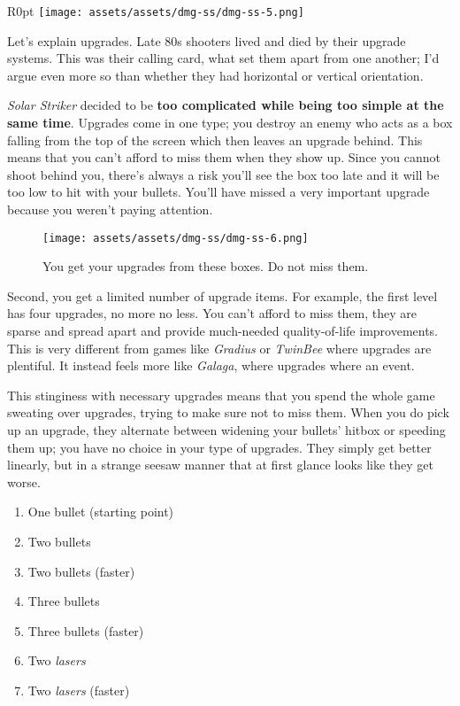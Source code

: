 \documentclass{book}
\begin{document}
\begin{wrapfigure}{R}{0pt} \texttt{[image: assets/assets/dmg-ss/dmg-ss-5.png]}\end{wrapfigure}
Let’s explain upgrades. Late 80s shooters lived and died by their upgrade systems. This was their calling card, what set them apart from one another; I’d argue even more so than whether they had horizontal or vertical orientation.

\emph{Solar Striker} decided to be \textbf{too complicated while being too simple at the same time}. Upgrades come in one type; you destroy an enemy who acts as a box falling from the top of the screen which then leaves an upgrade behind. This means that you can’t afford to miss them when they show up. Since you cannot shoot behind you, there’s always a risk you’ll see the box too late and it will be too low to hit with your bullets. You’ll have missed a very important upgrade because you weren’t paying attention.

\begin{figure}[hbt]
\vskip 10pt
\centering \texttt{[image: assets/assets/dmg-ss/dmg-ss-6.png]}\par\pagetwodescription You get your upgrades from these boxes. Do not miss them.
\vskip 6pt
\end{figure}

Second, you get a limited number of upgrade items. For example, the first level has four upgrades, no more no less. You can’t afford to miss them, they are sparse and spread apart and provide much-needed quality-of-life improvements. This is very different from games like \emph{Gradius} or \emph{TwinBee} where upgrades are plentiful. It instead feels more like \emph{Galaga}, where upgrades where an event.

This stinginess with necessary upgrades means that you spend the whole game sweating over upgrades, trying to make sure not to miss them. When you do pick up an upgrade, they alternate between widening your bullets’ hitbox or speeding them up; you have no choice in your type of upgrades. They simply get better linearly, but in a strange seesaw manner that at first glance looks like they get worse.

\begin{enumerate}
\item One bullet (starting point)
\item Two bullets
\item Two bullets (faster)
\item Three bullets
\item Three bullets (faster)
\item Two \emph{lasers}
\item Two \emph{lasers} (faster)
\end{enumerate}\noindent
\end{document}
